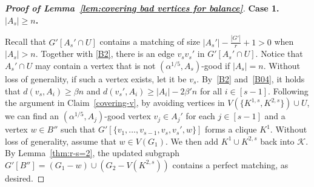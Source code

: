 \documentclass[11pt, a4paper]{article}
\theoremstyle{definition}
\newcommand{\<}{\subseteq}
\begin{document}
\begin{proof}[{\bf Proof of Lemma~\ref{lem:covering bad vertices for balance}}]
\medskip
{\bf Case 1. $|A_s|\geq n$.} %
\medskip

Recall that $G'[A_s'\cap U]$ contains a matching of size {$|A_s'|-\frac{|G'|}{r}+1>0$} when $|A_s|>n$. Together with \ref{B2}, there is an edge $v_sv_s'$ in $G'[A_s'\cap U]$. {Notice that $A_s'\cap U$ may contain a vertex that is not 
$(\alpha^{1/5},A_s)$-good  if $|A_s|=n$.  Without loss of generality, if such a vertex exists, let it be $v_s$. %
By~\ref{B2} and~\ref{B04}, it holds that   $d(v_s,A_i)\geq \beta  n$ and $d(v_s',A_i)\geq |A_i|-2\beta' n$ for all $i\in [s-1]$.}  Following the argument in Claim~\ref{covering-v}, by avoiding vertices in $V(\{K^{1,s},K^{2,s}\})\cup U$, we can find an \((\alpha^{1/5},A_j)\)-good vertex   
\(v_j\in A_j'\) for each \(j\in[s-1]\) and a vertex \(w\in B''\) such that  
\(G'[\{v_1,\dots,v_{s-1},v_s,v_s',w\}]\) forms a clique \(K^1\).  Without loss of generality, assume that $w\in V(G_1)$. We then add $K^1\cup K^{2,s}$ back into $\mathcal{K}$. %
By Lemma~\ref{thm:r-s=2}, the updated subgraph $G'[B''] = (G_1 - w) \cup (G_2 - V(K^{2,s}))$  contains a perfect matching, as desired.




\end{proof}
\end{document}
